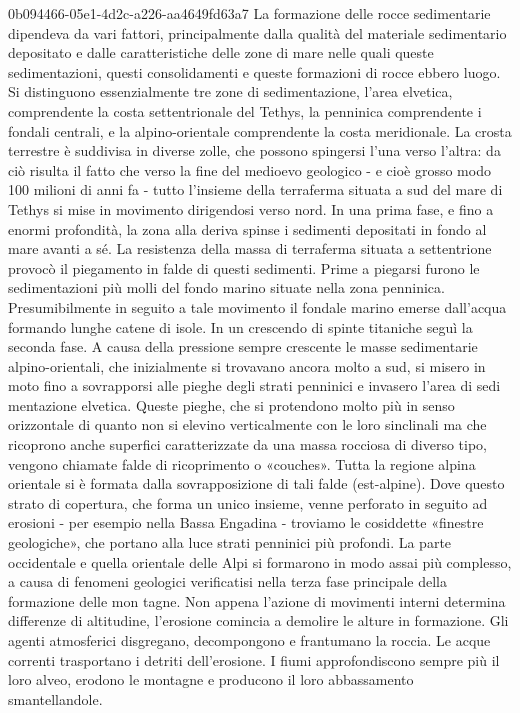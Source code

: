 \documentclass[preview]{standalone}
\begin{document}
\begin{snippet}{0b094466-05e1-4d2c-a226-aa4649fd63a7}
    La formazione delle rocce sedimentarie dipendeva da vari fattori, principalmente dalla qualità
    del materiale sedimentario depositato e dalle caratteristiche delle zone di mare nelle quali
    queste sedimentazioni, questi consolidamenti e queste formazioni di rocce ebbero luogo. Si
    distinguono essenzialmente tre zone di sedimentazione, l'area elvetica, comprendente la costa
    settentrionale del Tethys, la penninica comprendente i fondali centrali, e la alpino-orientale
    comprendente la costa meridionale. La crosta terrestre è suddivisa in diverse zolle, che
    possono spingersi l'una verso l'altra: da ciò risulta il fatto che verso la fine del medioevo
    geologico - e cioè grosso modo 100 milioni di anni fa - tutto l'insieme della terraferma situata
    a sud del mare di Tethys si mise in movimento dirigendosi verso nord.
    In una prima fase, e fino a enormi profondità, la zona alla deriva spinse i sedimenti depositati
    in fondo al mare avanti a sé. La resistenza della massa di terraferma situata a settentrione
    provocò il piegamento in falde di questi sedimenti. Prime a piegarsi furono le sedimentazioni
    più molli del fondo marino situate nella zona penninica. Presumibilmente in seguito a tale
    movimento il fondale marino emerse dall'acqua formando lunghe catene di isole. In un
    crescendo di spinte titaniche seguì la seconda fase. A causa della pressione sempre crescente
    le masse sedimentarie alpino-orientali, che inizialmente si trovavano ancora molto a sud, si
    misero in moto fino a sovrapporsi alle pieghe degli strati penninici e invasero l'area di sedi
    mentazione elvetica. Queste pieghe, che si protendono molto più in senso orizzontale di
    quanto non si elevino verticalmente con le loro sinclinali ma che ricoprono anche superfici
    caratterizzate da una massa rocciosa di diverso tipo, vengono chiamate falde di ricoprimento
    o «couches». Tutta la regione alpina orientale si è formata dalla sovrapposizione di tali falde
    (est-alpine). Dove questo strato di copertura, che forma un unico insieme, venne perforato in
    seguito ad erosioni - per esempio nella Bassa Engadina - troviamo le cosiddette «finestre
    geologiche», che portano alla luce strati penninici più profondi.
    La parte occidentale e quella orientale delle Alpi si formarono in modo assai più complesso, a
    causa di fenomeni geologici verificatisi nella terza fase principale della formazione delle mon
    tagne. Non appena l'azione di movimenti interni determina differenze di altitudine, l'erosione
    comincia a demolire le alture in formazione. Gli agenti atmosferici disgregano, decompongono
    e frantumano la roccia. Le acque correnti trasportano i detriti dell'erosione. I fiumi
    approfondiscono sempre più il loro alveo, erodono le montagne e producono il loro
    abbassamento smantellandole.
\end{snippet}
\end{document}
